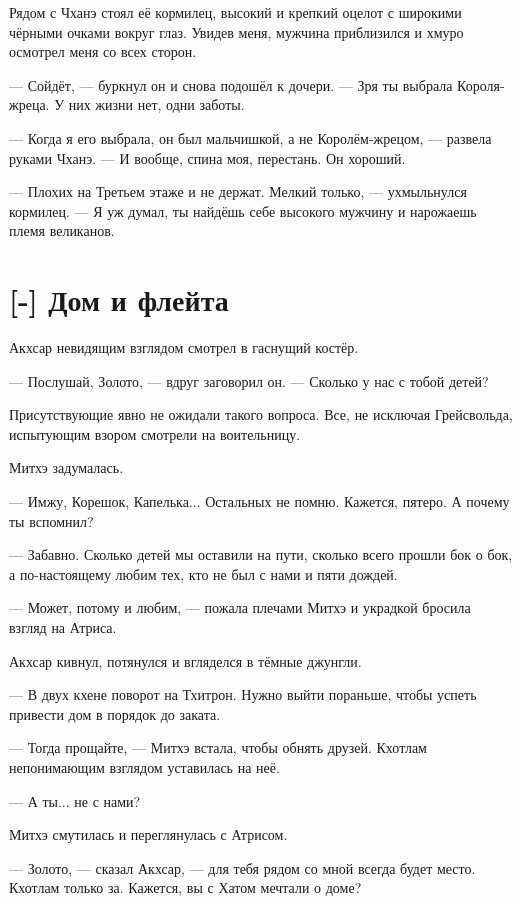 \textspace

Рядом с Чханэ стоял её кормилец, высокий и крепкий оцелот с широкими чёрными очками вокруг глаз.
Увидев меня, мужчина приблизился и хмуро осмотрел меня со всех сторон.

--- Сойдёт, --- буркнул он и снова подошёл к дочери.
--- Зря ты выбрала Короля-жреца.
У них жизни нет, одни заботы.

--- Когда я его выбрала, он был мальчишкой, а не Королём-жрецом, --- развела руками Чханэ.
--- И вообще, спина моя, перестань.
Он хороший.

--- Плохих на Третьем этаже и не держат.
Мелкий только, --- ухмыльнулся кормилец.
--- Я уж думал, ты найдёшь себе высокого мужчину и нарожаешь племя великанов.

\textspace

\section{[-] Дом и флейта}

\textspace

Акхсар невидящим взглядом смотрел в гаснущий костёр.

--- Послушай, Золото, --- вдруг заговорил он.
--- Сколько у нас с тобой детей?

Присутствующие явно не ожидали такого вопроса.
Все, не исключая Грейсвольда, испытующим взором смотрели на воительницу.

Митхэ задумалась.

--- Имжу, Корешок, Капелька...
Остальных не помню.
Кажется, пятеро.
А почему ты вспомнил?

--- Забавно.
Сколько детей мы оставили на пути, сколько всего прошли бок о бок, а по-настоящему любим тех, кто не был с нами и пяти дождей.

--- Может, потому и любим, --- пожала плечами Митхэ и украдкой бросила взгляд на Атриса.

Акхсар кивнул, потянулся и вгляделся в тёмные джунгли.

--- В двух кхене поворот на Тхитрон.
Нужно выйти пораньше, чтобы успеть привести дом в порядок до заката.

--- Тогда прощайте, --- Митхэ встала, чтобы обнять друзей.
Кхотлам непонимающим взглядом уставилась на неё.

--- А ты... не с нами?

Митхэ смутилась и переглянулась с Атрисом.

--- Золото, --- сказал Акхсар, --- для тебя рядом со мной всегда будет место.
Кхотлам только за.
Кажется, вы с Хатом мечтали о доме?

